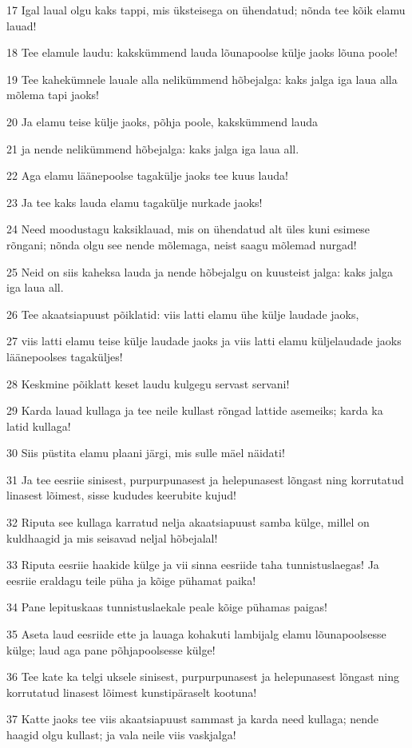 \par 17 Igal laual olgu kaks tappi, mis üksteisega on ühendatud; nõnda tee kõik elamu lauad!
\par 18 Tee elamule laudu: kakskümmend lauda lõunapoolse külje jaoks lõuna poole!
\par 19 Tee kahekümnele lauale alla nelikümmend hõbejalga: kaks jalga iga laua alla mõlema tapi jaoks!
\par 20 Ja elamu teise külje jaoks, põhja poole, kakskümmend lauda
\par 21 ja nende nelikümmend hõbejalga: kaks jalga iga laua all.
\par 22 Aga elamu läänepoolse tagakülje jaoks tee kuus lauda!
\par 23 Ja tee kaks lauda elamu tagakülje nurkade jaoks!
\par 24 Need moodustagu kaksiklauad, mis on ühendatud alt üles kuni esimese rõngani; nõnda olgu see nende mõlemaga, neist saagu mõlemad nurgad!
\par 25 Neid on siis kaheksa lauda ja nende hõbejalgu on kuusteist jalga: kaks jalga iga laua all.
\par 26 Tee akaatsiapuust põiklatid: viis latti elamu ühe külje laudade jaoks,
\par 27 viis latti elamu teise külje laudade jaoks ja viis latti elamu küljelaudade jaoks läänepoolses tagaküljes!
\par 28 Keskmine põiklatt keset laudu kulgegu servast servani!
\par 29 Karda lauad kullaga ja tee neile kullast rõngad lattide asemeiks; karda ka latid kullaga!
\par 30 Siis püstita elamu plaani järgi, mis sulle mäel näidati!
\par 31 Ja tee eesriie sinisest, purpurpunasest ja helepunasest lõngast ning korrutatud linasest lõimest, sisse kududes keerubite kujud!
\par 32 Riputa see kullaga karratud nelja akaatsiapuust samba külge, millel on kuldhaagid ja mis seisavad neljal hõbejalal!
\par 33 Riputa eesriie haakide külge ja vii sinna eesriide taha tunnistuslaegas! Ja eesriie eraldagu teile püha ja kõige pühamat paika!
\par 34 Pane lepituskaas tunnistuslaekale peale kõige pühamas paigas!
\par 35 Aseta laud eesriide ette ja lauaga kohakuti lambijalg elamu lõunapoolsesse külge; laud aga pane põhjapoolsesse külge!
\par 36 Tee kate ka telgi uksele sinisest, purpurpunasest ja helepunasest lõngast ning korrutatud linasest lõimest kunstipäraselt kootuna!
\par 37 Katte jaoks tee viis akaatsiapuust sammast ja karda need kullaga; nende haagid olgu kullast; ja vala neile viis vaskjalga!

